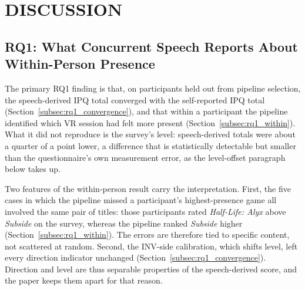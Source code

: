 \section{DISCUSSION}
\label{sec:discussion}

\subsection{RQ1: What Concurrent Speech Reports About Within-Person Presence}

The primary RQ1 finding is that, on participants held out from pipeline selection, the speech-derived IPQ total converged with the self-reported IPQ total (Section~\ref{subsec:rq1_convergence}), and that within a participant the pipeline identified which VR session had felt more present (Section~\ref{subsec:rq1_within}). What it did not reproduce is the survey's level: speech-derived totals were about a quarter of a point lower, a difference that is statistically detectable but smaller than the questionnaire's own measurement error, as the level-offset paragraph below takes up.

Two features of the within-person result carry the interpretation. First, the five cases in which the pipeline missed a participant's highest-presence game all involved the same pair of titles: those participants rated \textit{Half-Life: Alyx} above \textit{Subside} on the survey, whereas the pipeline ranked \textit{Subside} higher (Section~\ref{subsec:rq1_within}). The errors are therefore tied to specific content, not scattered at random. Second, the INV-side calibration, which shifts level, left every direction indicator unchanged (Section~\ref{subsec:rq1_convergence}). Direction and level are thus separable properties of the speech-derived score, and the paper keeps them apart for that reason.

